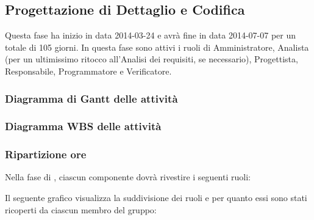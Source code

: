 \subsection{Progettazione di Dettaglio e Codifica}
Questa fase ha inizio in data 2014-03-24 e avrà fine in data 2014-07-07 per un totale di 105 giorni. In questa fase sono attivi i ruoli di Amministratore, Analista (per un ultimissimo ritocco all'Analisi dei requisiti, se necessario), Progettista, Responsabile, Programmatore e Verificatore.

\subsubsection{Diagramma di Gantt delle attività}

\newpage
\subsubsection{Diagramma WBS delle attività}

\newpage
\subsubsection{Ripartizione ore}

\newpage
Nella fase di , ciascun componente dovrà rivestire i seguenti ruoli:

Il seguente grafico visualizza la suddivisione dei ruoli e per quanto essi sono stati ricoperti da ciascun membro del gruppo:
